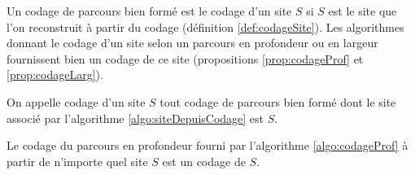 Un codage de parcours bien formé est le codage d'un site $S$ si $S$ est le site que l'on reconstruit à partir du codage (définition \ref{def:codageSite}). Les algorithmes donnant le codage d'un site selon un parcours en profondeur ou en largeur fournissent bien un codage de ce site (propositions \ref{prop:codageProf} et \ref{prop:codageLarg}).


\begin{defi}
 On appelle codage d'un site $S$ tout codage de parcours bien formé dont le site associé par l'algorithme \ref{algo:siteDepuisCodage} est $S$.
\label{def:codageSite}
\end{defi}

\begin{prop}
 Le codage du parcours en profondeur fourni par l'algorithme \ref{algo:codageProf} à partir de n'importe quel site $S$ est un codage de $S$.
\label{prop:codageProf}
\end{prop}


